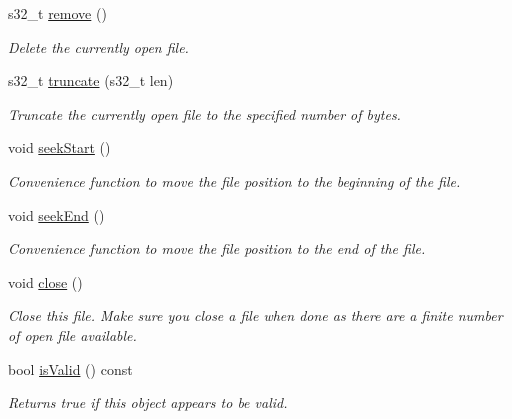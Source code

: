 \begin{DoxyCompactItemize}
s32\+\_\+t \mbox{\hyperlink{class_spiffs_particle_file_a0a5b83d74718f890d0e449fb7c3bf818}{remove}} ()
\begin{DoxyCompactList}\small\item\em Delete the currently open file. \end{DoxyCompactList}\item 
s32\+\_\+t \mbox{\hyperlink{class_spiffs_particle_file_ae6d57777d56e7594d811c0e7e0e74eab}{truncate}} (s32\+\_\+t len)
\begin{DoxyCompactList}\small\item\em Truncate the currently open file to the specified number of bytes. \end{DoxyCompactList}\item 
\mbox{\label{class_spiffs_particle_file_abc5ffc192fa134728111aff8a2105592}} 
void \mbox{\hyperlink{class_spiffs_particle_file_abc5ffc192fa134728111aff8a2105592}{seek\+Start}} ()
\begin{DoxyCompactList}\small\item\em Convenience function to move the file position to the beginning of the file. \end{DoxyCompactList}\item 
\mbox{\label{class_spiffs_particle_file_a7bb1b4420d8a42cdc66db29d0a5bc1a8}} 
void \mbox{\hyperlink{class_spiffs_particle_file_a7bb1b4420d8a42cdc66db29d0a5bc1a8}{seek\+End}} ()
\begin{DoxyCompactList}\small\item\em Convenience function to move the file position to the end of the file. \end{DoxyCompactList}\item 
\mbox{\label{class_spiffs_particle_file_a0dd9ea24f86d4639ed83e24101968298}} 
void \mbox{\hyperlink{class_spiffs_particle_file_a0dd9ea24f86d4639ed83e24101968298}{close}} ()
\begin{DoxyCompactList}\small\item\em Close this file. Make sure you close a file when done as there are a finite number of open file available. \end{DoxyCompactList}\item 
bool \mbox{\hyperlink{class_spiffs_particle_file_aa47bab32911760edd8477bcd54f1271d}{is\+Valid}} () const
\begin{DoxyCompactList}\small\item\em Returns true if this object appears to be valid. \end{DoxyCompactList}\item 

\end{DoxyCompactItemize}
